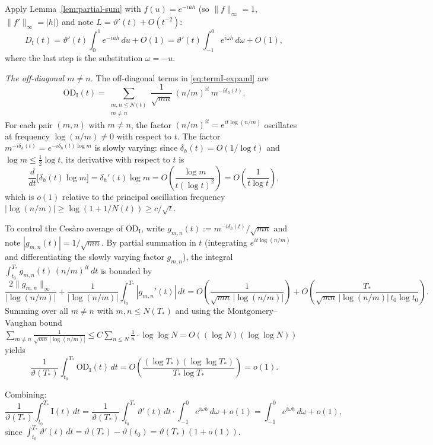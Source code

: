 \documentclass[11pt]{article}
\theoremstyle{plain}
\theoremstyle{definition}
\newcommand{\assign}{:=}
\begin{document}
Apply Lemma~\ref{lem:partial-sum} with $f(u)=e^{-iuh}$
(so $\|f\|_\infty=1$, $\|f'\|_\infty=|h|$)
and note $L = \vartheta'(t) + O(t^{-2})$:
\begin{equation}\label{eq:diagI-value}
D_{\mathrm{I}}(t)
= \vartheta'(t)\int_0^1 e^{-iuh}\,du + O(1)
= \vartheta'(t)\int_{-1}^0 e^{i\omega h}\,d\omega + O(1),
\end{equation}
where the last step is the substitution $\omega=-u$.

\medskip\noindent
\textit{The off-diagonal $m\ne n$.}\enspace
The off-diagonal terms in \eqref{eq:termI-expand} are
\[
\mathrm{OD}_{\mathrm{I}}(t)
= \sum_{\substack{m,n\le N(t)\\m\ne n}}
  \frac{1}{\sqrt{mn}}\,(n/m)^{it}\,m^{-i\delta_h(t)}.
\]
For each pair $(m,n)$ with $m\ne n$,
the factor $(n/m)^{it}=e^{it\log(n/m)}$ oscillates
at frequency $\log(n/m)\ne 0$ with respect to $t$.
The factor $m^{-i\delta_h(t)} = e^{-i\delta_h(t)\log m}$
is slowly varying: since $\delta_h(t)=O(1/\log t)$
and $\log m \le \frac{1}{2}\log t$, its derivative with respect to $t$ is
\[
\frac{d}{dt}\bigl[\delta_h(t)\log m\bigr]
= \delta_h'(t)\log m
= O\!\left(\frac{\log m}{t(\log t)^2}\right)
= O\!\left(\frac{1}{t\log t}\right),
\]
which is $o(1)$ relative to the principal oscillation frequency
$|\log(n/m)|\ge \log(1+1/N(t)) \ge c/\sqrt{t}$.

To control the Ces\`aro average of $\mathrm{OD}_{\mathrm{I}}$,
write $g_{m,n}(t)\assign m^{-i\delta_h(t)}/\sqrt{mn}$
and note $|g_{m,n}(t)|=1/\sqrt{mn}$.
By partial summation in $t$
(integrating $e^{it\log(n/m)}$ and differentiating
the slowly varying factor $g_{m,n}$),
the integral
$\int_{t_0}^{T_*} g_{m,n}(t)\,(n/m)^{it}\,dt$
is bounded by
\[
\frac{2\|g_{m,n}\|_\infty}{|\log(n/m)|}
+ \frac{1}{|\log(n/m)|}
  \int_{t_0}^{T_*}|g_{m,n}'(t)|\,dt
= O\!\left(\frac{1}{\sqrt{mn}\,|\log(n/m)|}\right)
+ O\!\left(\frac{T_*}{\sqrt{mn}\,|\log(n/m)|\,t_0\log t_0}\right).
\]
Summing over all $m\ne n$ with $m,n\le N(T_*)$
and using the Montgomery--Vaughan bound
$\sum_{m\ne n}\frac{1}{\sqrt{mn}\,|\log(n/m)|}
\le C\sum_{n\le N}\frac{1}{n}\cdot\log\log N
= O((\log N)(\log\log N))$
yields
\[
\frac{1}{\vartheta(T_*)}
\int_{t_0}^{T_*}\mathrm{OD}_{\mathrm{I}}(t)\,dt
= O\!\left(\frac{(\log T_*)(\log\log T_*)}{T_*\log T_*}\right)
= o(1).
\]

Combining:
\begin{equation}\label{eq:termI-cesaro}
\frac{1}{\vartheta(T_*)}
\int_{t_0}^{T_*} \mathrm{I}(t)\,dt
= \frac{1}{\vartheta(T_*)}
  \int_{t_0}^{T_*} \vartheta'(t)\,dt
  \cdot\int_{-1}^0 e^{i\omega h}\,d\omega
  + o(1)
= \int_{-1}^0 e^{i\omega h}\,d\omega + o(1),
\end{equation}
since $\int_{t_0}^{T_*}\vartheta'(t)\,dt
= \vartheta(T_*)-\vartheta(t_0)
= \vartheta(T_*)(1+o(1))$.
\end{document}
